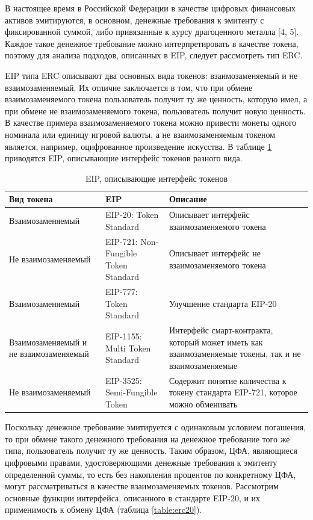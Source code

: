 \documentclass[a4paper, 10pt]{article}
\begin{document}
	В настоящее время в Российской Федерации в качестве цифровых финансовых активов эмитируются, в основном, денежные требования к эмитенту с фиксированной суммой, либо привязанные к курсу драгоценного металла [4, 5]. Каждое такое денежное требование можно интерпретировать в качестве токена, поэтому для анализа подходов, описанных в EIP, следует рассмотреть тип ERC. 
	
	EIP типа ERC описывают два основных вида токенов: взаимозаменяемый и не взаимозаменяемый. Их отличие заключается в том, что при обмене взаимозаменяемого токена пользователь получит ту же ценность, которую имел, а при обмене не взаимозаменяемого токена, пользователь получит новую ценность. В качестве примера взаимозаменяемого токена можно привести монеты одного номинала или единицу игровой валюты, а не взаимозаменяемым токеном является, например, оцифрованное произведение искусства. В таблице \ref{table:eip} приводятся EIP, описывающие интерфейс токенов разного вида.
	
	\begin{longtable}{|p{3.5cm}|p{6.1cm}|p{6.2cm}|}
		\caption{EIP, описывающие интерфейс токенов}
		\label{table:eip}\\
		\hline
		
		\textbf{Вид токена} 
		& \textbf{EIP} 
		& \textbf{Описание}\\
		\hline
		
		Взаимозаменяемый
		& EIP-20: Token Standard
		& Описывает интерфейс взаимозаменяемого токена\\
		\hline
		
		Не взаимозаменяемый
		& EIP-721: Non-Fungible Token Standard
		& Описывает интерфейс не взаимозаменяемого токена\\
		\hline
		
		Взаимозаменяемый
		& EIP-777: Token Standard
		& Улучшение стандарта EIP-20\\
		\hline
		
		Взаимозаменяемый и не взаимозаменяемый
		& EIP-1155: Multi Token Standard
		& Интерфейс смарт-контракта, который может иметь как взаимозаменяемые токены, так и не взаимозаменяемые\\
		\hline
		
		Не взаимозаменяемый
		& EIP-3525: Semi-Fungible Token
		& Содержит понятие количества к токену стандарта EIP-721, которое можно обменивать\\
		\hline
	\end{longtable}
	
	Поскольку денежное требование эмитируется с одинаковым условием погашения, то при обмене такого денежного требования на денежное требование того же типа, пользователь получит ту же ценность. Таким образом, ЦФА, являющиеся цифровыми правами, удостоверяющими денежные требования к эмитенту определенной суммы, то есть без накопления процентов по конкретному ЦФА, могут рассматриваться в качестве взаимозаменяемых токенов.
	Рассмотрим основные функции интерфейса, описанного в стандарте EIP-20, и их применимость к обмену ЦФА (таблица \ref{table:erc20}).
	
\end{document}
